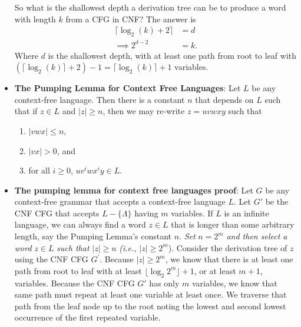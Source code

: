 \documentclass{report}
\begin{document}
\begin{itemize}
            So what is the shallowest depth a derivation tree can be to produce a word with length $k$ from a CFG in CNF? The answer is 
            \begin{align*}
                \lceil\log_{2}{(k)} + 2\rceil &= d \\
                \implies 2^{d-2} &= k
            .\end{align*}
            Where $d$ is the shallowest depth, with at least one path from root to leaf with $(\lceil \log_{2}{(k)}\rceil+2) -1 = \lceil\log_{2}{(k)}\rceil+1$ variables.
        \item \textbf{The Pumping Lemma for Context Free Languages}: Let \( L \) be any context-free language. Then there is a constant \( n \) that depends on \( L \) such that if \( z \in L \) and \( |z| \geq n \), then we may re-write \( z = uvwxy \) such that
            \begin{enumerate}
                \item \( |vwx| \leq n \),
                \item \( |vx| > 0 \), and
                \item for all \( i \geq 0 \), \( uv^i wx^i y \in L \).
            \end{enumerate}
        \item \textbf{The pumping lemma for context free languages proof}:
            Let \( G \) be any context-free grammar that accepts a context-free language \( L \).
            \bigbreak \noindent 
            Let \( G' \) be the CNF CFG that accepts \( L - \{\Lambda\} \) having \( m \) variables.
            \bigbreak \noindent 
            If \( L \) is an infinite language, we can always find a word \( z \in L \) that is longer than some arbitrary length, say the Pumping Lemma’s constant \( n \).
            \bigbreak \noindent
            \textit{Set} \( n = 2^m \) \textit{and then select a word} \( z \in L \) \textit{such that} \( |z| \geq n \) \textit{(i.e.,} \( |z| \geq 2^m \)).
            \bigbreak \noindent 
            Consider the derivation tree of $z$ using the CNF CFG $G^{\prime}$.
            \bigbreak \noindent 
            Because \( |z| \geq 2^m \), we know that there is at least one path from root to leaf with at least \( \lfloor \log_2 2^m \rfloor + 1 \), or at least \( m + 1 \), variables.
            \bigbreak \noindent 
                Because the CNF CFG \( G' \) has only \( m \) variables, we know that same path must repeat at least one variable at least once.
                \bigbreak \noindent 
                We traverse that path from the leaf node up to the root noting the lowest and second lowest occurrence of the first repeated variable.

\end{itemize}
\end{document}
